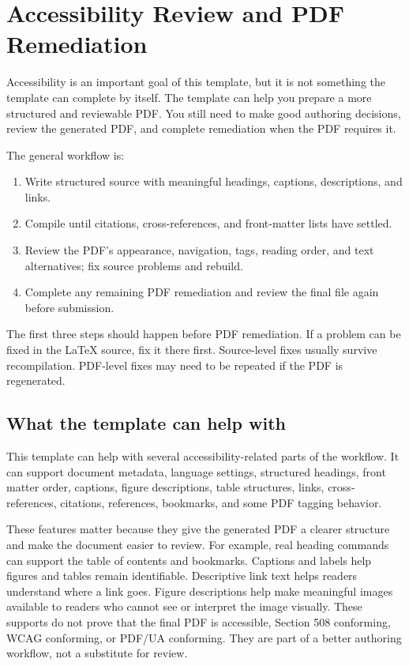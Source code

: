 \chapter{Accessibility Review and PDF Remediation}
\label{chap:accessibility-remediation}

Accessibility is an important goal of this template, but it is not something the template can complete by itself. The template can help you prepare a more structured and reviewable PDF. You still need to make good authoring decisions, review the generated PDF, and complete remediation when the PDF requires it.

The general workflow is:

\begin{enumerate}
    \item Write structured source with meaningful headings, captions, descriptions, and links.
    \item Compile until citations, cross-references, and front-matter lists have settled.
    \item Review the PDF's appearance, navigation, tags, reading order, and text alternatives; fix source problems and rebuild.
    \item Complete any remaining PDF remediation and review the final file again before submission.
\end{enumerate}

The first three steps should happen before PDF remediation. If a problem can be fixed in the \LaTeX{} source, fix it there first. Source-level fixes usually survive recompilation. PDF-level fixes may need to be repeated if the PDF is regenerated.

\section{What the template can help with}
\label{sec:template-accessibility-support}

This template can help with several accessibility-related parts of the workflow. It can support document metadata, language settings, structured headings, front matter order, captions, figure descriptions, table structures, links, cross-references, citations, references, bookmarks, and some PDF tagging behavior.

These features matter because they give the generated PDF a clearer structure and make the document easier to review. For example, real heading commands can support the table of contents and bookmarks. Captions and labels help figures and tables remain identifiable. Descriptive link text helps readers understand where a link goes. Figure descriptions help make meaningful images available to readers who cannot see or interpret the image visually. These supports do not prove that the final PDF is accessible, Section 508 conforming, WCAG conforming, or PDF/UA conforming. They are part of a better authoring workflow, not a substitute for review.

